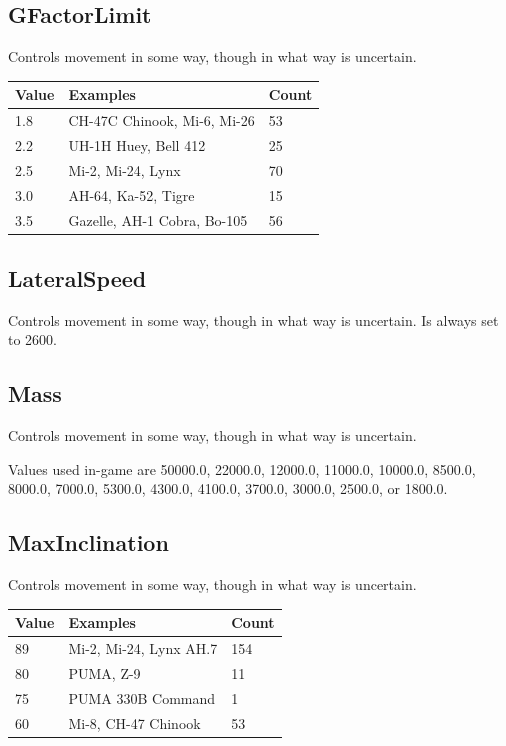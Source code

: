\documentclass{article}
\begin{document}
\subsection{GFactorLimit}

Controls movement in some way, though in what way is uncertain.

\begin{center}
    \begin{tabular}{ | l | l | l |}
    \hline
	Value & Examples & Count\\ \hline
	1.8 & CH-47C Chinook, Mi-6, Mi-26 & 53\\
	2.2 & UH-1H Huey, Bell 412 & 25\\
	2.5 & Mi-2, Mi-24, Lynx & 70\\
	3.0 & AH-64, Ka-52, Tigre & 15\\
	3.5 & Gazelle, AH-1 Cobra, Bo-105 & 56\\
    \hline
    \end{tabular}
\end{center}

\subsection{LateralSpeed}

Controls movement in some way, though in what way is uncertain. Is always set to 2600.

\subsection{Mass}

Controls movement in some way, though in what way is uncertain.

Values used in-game are 50000.0, 22000.0, 12000.0, 11000.0, 10000.0, 8500.0, 8000.0, 7000.0, 5300.0, 4300.0, 4100.0, 3700.0, 3000.0, 2500.0, or 1800.0.

\subsection{MaxInclination}

Controls movement in some way, though in what way is uncertain.

\begin{center}
    \begin{tabular}{ | l | l | l |}
    \hline
	Value & Examples & Count\\ \hline
	89 & Mi-2, Mi-24, Lynx AH.7 & 154\\
	80 & PUMA, Z-9 & 11\\
	75 & PUMA 330B Command & 1\\
	60 & Mi-8, CH-47 Chinook & 53\\
    \hline
    \end{tabular}
\end{center}
\end{document}
